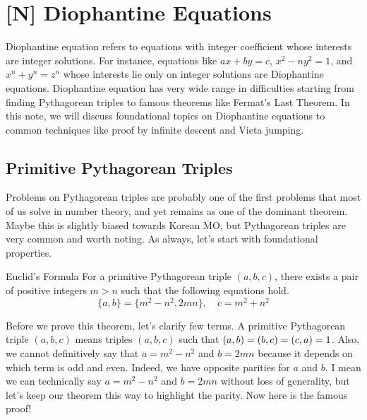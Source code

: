 \documentclass[../../main.tex]{subfiles}
\begin{document}
\chapter{[N] Diophantine Equations}

Diophantine equation refers to equations with integer coefficient
whose interests are integer solutions. For instance, equations like
$ax + by = c$, $x^2 - ny^2 = 1$, and $x^n + y^n = z^n$ whose
interests lie only on integer solutions are Diophantine equations.
Diophantine equation has very wide range in difficulties starting
from finding Pythagorean triples to famous theorems like
Fermat's Last Theorem. In this note, we will discuss foundational
topics on Diophantine equations to common techniques like proof
by infinite descent and Vieta jumping.

\section{Primitive Pythagorean Triples}

Problems on Pythagorean triples are probably one of the first
problems that most of us solve in number theory, and yet
remains as one of the dominant theorem. Maybe this is slightly
biased towards Korean MO, but Pythagorean triples are very
common and worth noting. As always, let's start with foundational
properties.

\begin{theorem}{}{Euclid's Formula}
For a primitive Pythagorean triple $(a, b, c)$, there exists a pair
of positive integers $m > n$ such that the following equations hold.
\[
\{ a, b \} = \{ m^2 - n^2, 2mn \}, \quad
c = m^2 + n^2
\]
\end{theorem}

Before we prove this theorem, let's clarify few terms. A primitive
Pythagorean triple $(a, b, c)$ means triples $(a, b, c)$ such that
$(a, b) = (b, c) \linebreak = (c, a) = 1$. Also, we cannot
definitively say that $a = m^2 - n^2$ and $b = 2mn$ because it depends
on which term is odd and even. Indeed, we have opposite parities for
$a$ and $b$. I mean we can technically say $a = m^2 - n^2$ and
$b = 2mn$ without loss of generality, but let's keep our theorem
this way to highlight the parity. Now here is the famous proof!
\end{document}
